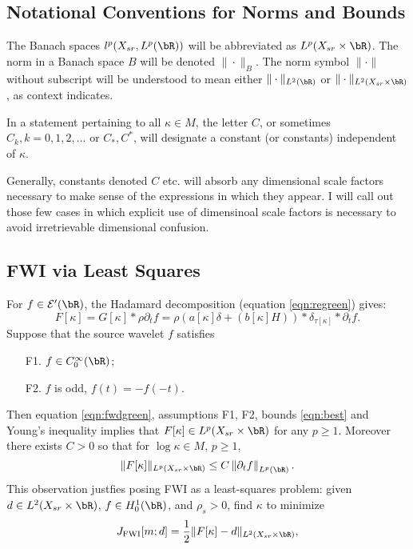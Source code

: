 \subsection{Notational Conventions for Norms and Bounds}
The Banach spaces
$l^p(X_{sr},L^p(\bR))$ will be abbreviated as $L^p(X_{sr} \times
\bR)$. The norm in a Banach space $B$ will be denoted
$\|\cdot\|_{B}$. The norm symbol
$\|\cdot\|$ without subscript will be understood to mean either
$\|\cdot\|_{L^2(\bR)}$ or $\|\cdot\|_{L^2(X_{sr}\times
  \bR)}$, as context indicates.

In a statement pertaining to all
$\kappa \in M$, the letter $C$, or sometimes $C_k,
k=0,1,2,...$ or
$C_*,C^*$, will designate a constant (or constants) independent of
$\kappa$.

Generally, constants denoted $C$ etc. will absorb any dimensional
scale factors necessary to make sense of the expressions in which they
appear. I will call out those few cases in which explicit use of
dimensinoal scale factors is necessary to avoid irretrievable
dimensional confusion.

\subsection{FWI via Least Squares}
For $f \in {\cal E}'(\bR)$, the Hadamard decomposition 
(equation \ref{eqn:regreen}) gives:
\begin{equation}
  \label{eqn:fwdgreen}
  F[\kappa] = G[\kappa] * \rho \partial_t f  = \rho( a[\kappa]\delta
  +  (b[\kappa]H)) *\delta_{\tau[\kappa]}*\partial_t f.
\end{equation}
Suppose that the source wavelet $f$ satisfies
\begin{itemize}
\item[F1. ] $f \in C^{\infty}_0(\bR)$;
\item[F2. ] $f$ is odd, $f(t) = -f(-t)$.
\end{itemize}
Then equation \ref{eqn:fwdgreen}, assumptions F1, F2, bounds
\ref{eqn:best} and Young's inequality implies that $F[\kappa] \in
L^p(X_{sr} \times \bR)$ for any $p \ge 1$. Moreover there exists
$C>0$ so that for $\log \kappa\in M$, $p \ge 1$,
\begin{equation}
  \label{eqn:fwdnorm}
  \|F[\kappa]\|_{L^p(X_{sr} \times \bR)} \le C \left\|\partial_t f\right\|_{L^p(\bR)}.
\end{equation}
This observation justfies posing FWI as a least-squares problem: given $d \in
L^2(X_{sr}\times \bR)$, $f \in H^1_0(\bR)$, and $\rho_s>0$, find $\kappa$ to minimize
\begin{equation}
  \label{eqn:fwi}
  J_{\rm FWI}[m;d]= \frac{1}{2}\|F[\kappa]-d\|_{L^2(X_{sr} \times \bR)},
\end{equation}

